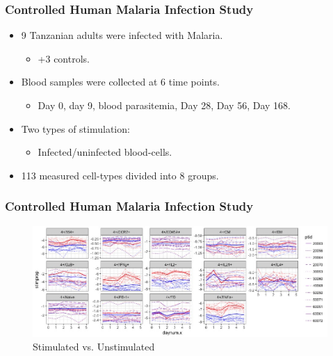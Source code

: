\documentclass{beamer}
\theoremstyle{definition}
\begin{document}
\begin{frame}
\frametitle{Controlled Human Malaria Infection Study}
\begin{itemize}
\item 9 Tanzanian adults were infected with Malaria.
	\begin{itemize}
	\item +3 controls.
	\end{itemize}
	\vspace{0.75 cm}
	
\item Blood samples were collected at 6 time points.
	\begin{itemize}
	\item Day 0, day 9, blood  parasitemia, Day 28, Day 56, Day 168.
	\end{itemize}
	\vspace{0.75 cm}

\item Two types of stimulation:
	\begin{itemize}
	\item Infected/uninfected blood-cells.
	\end{itemize}
	\vspace{0.75 cm}
	
\item 113 measured cell-types divided into 8 groups. 
\end{itemize}
\end{frame}


\begin{frame}
\frametitle{Controlled Human Malaria Infection Study}
\begin{figure}[]
\includegraphics[width=13 cm]{figures/4plusSmoothed} \caption{Stimulated vs. Unstimulated}
\end{figure}
\end{frame}

\end{document}
